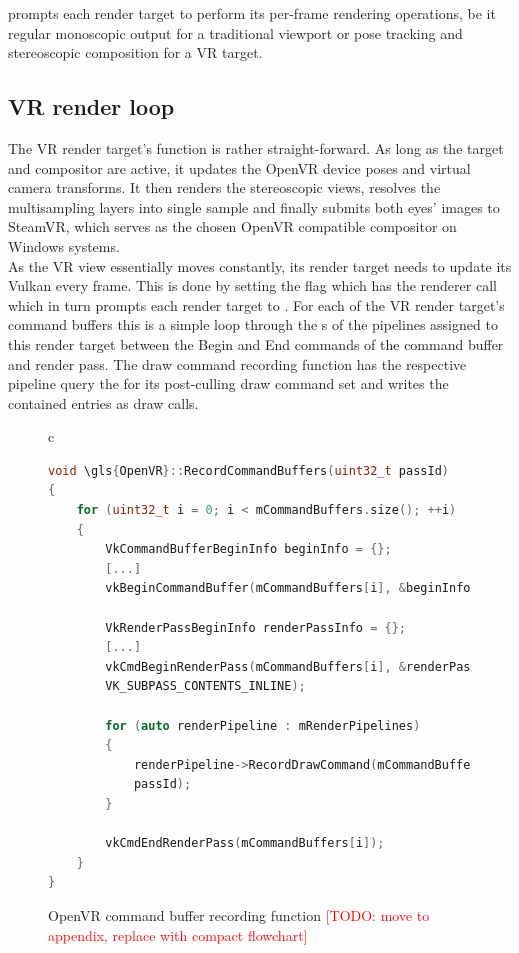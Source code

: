  prompts each render target to perform its per-frame rendering operations, be it regular monoscopic output for a traditional viewport or pose tracking and stereoscopic composition for a \gls{VR} target. 

\subsection{VR render loop}
The \gls{VR} render target's  function is rather straight-forward. 
As long as the target and compositor are active, it updates the \gls{OpenVR} device poses and virtual camera transforms. It then renders the stereoscopic views, resolves the multisampling layers into single sample and finally submits both eyes' images to SteamVR, which serves as the chosen \gls{OpenVR} compatible compositor on Windows systems. \\

As the \gls{VR} view essentially moves constantly, its render target needs to update its Vulkan  every frame. This is done by setting the  flag which has the renderer call  which in turn prompts each render target to . For each of the \gls{VR} render target's command buffers this is a simple loop through the s of the pipelines assigned to this render target between the Begin and End commands of the command buffer and render pass. The draw command recording function has the respective pipeline query the  for its post-culling draw command set and writes the contained entries as  draw calls. 

\begin{figure}[htb]
  \centering
  \begin{tabular}{c}
  \begin{lstlisting}[language=C++]
void \gls{OpenVR}::RecordCommandBuffers(uint32_t passId)
{
	for (uint32_t i = 0; i < mCommandBuffers.size(); ++i)
	{
		VkCommandBufferBeginInfo beginInfo = {};
		[...]
		vkBeginCommandBuffer(mCommandBuffers[i], &beginInfo);

		VkRenderPassBeginInfo renderPassInfo = {};
		[...]
		vkCmdBeginRenderPass(mCommandBuffers[i], &renderPassInfo, 
		VK_SUBPASS_CONTENTS_INLINE);

		for (auto renderPipeline : mRenderPipelines)
		{
			renderPipeline->RecordDrawCommand(mCommandBuffers[i], 
			passId);
		}

		vkCmdEndRenderPass(mCommandBuffers[i]);
	}
}
	\end{lstlisting}
  \end{tabular}
  \caption[\gls{OpenVR} render target's RecordCommandBuffers]{\gls{OpenVR} command buffer recording function \textcolor{red}{[TODO: move to appendix, replace with compact flowchart]}}\label{fig:lst_\gls{OpenVR}_RecordCommandBuffers}
\end{figure}

